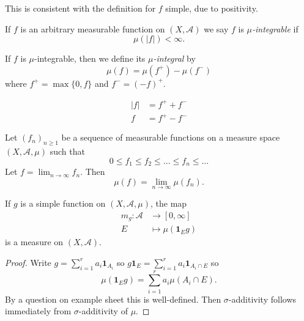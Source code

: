\documentclass[a4paper]{article}
\begin{document}
\begin{remark}
  This is consistent with the definition for \(f\) simple, due to positivity.
\end{remark}

\begin{definition}[integrable]
  If \(f\) is an arbitrary measurable function on \((X, \mathcal A)\) we say \(f\) is \emph{\(\mu\)-integrable} if
  \[
    \mu(|f|) < \infty.
  \]
\end{definition}

\begin{definition}
  If \(f\) is \(\mu\)-integrable, then we define its \emph{\(\mu\)-integral} by
  \[
    \mu(f) = \mu(f^+) - \mu(f^-)
  \]
  where \(f^+ = \max\{0, f\}\) and \(f^- = (-f)^+\).
\end{definition}

\begin{note}
  \begin{align*}
    |f| &= f^+ + f^- \\
    f &= f^+ - f^-
  \end{align*}
\end{note}

\begin{theorem}
  \label{thm:monotone convergence theorem}
  Let \((f_n)_{n \geq 1}\) be a sequence of measurable functions on a measure space \((X, \mathcal A, \mu)\) such that
  \[
    0 \leq f_1 \leq f_2 \leq \dots \leq f_n \leq \dots
  \]
  Let \(f = \lim_{n \to \infty} f_n\). Then
  \[
    \mu(f) = \lim_{n \to \infty} \mu(f_n).
  \]
\end{theorem}

\begin{lemma}
  If \(g\) is a simple function on \((X, \mathcal A, \mu)\), the map
  \begin{align*}
    m_g: \mathcal A &\to [0, \infty] \\
    E &\mapsto \mu(\mathbf 1_E g)
  \end{align*}
  is a measure on \((X, \mathcal A)\).
\end{lemma}

\begin{proof}
  Write \(g = \sum_{i = 1}^r a_i \mathbf 1_{A_i}\) so \(g \mathbf 1_E = \sum_{i = 1}^r a_i \mathbf 1_{A_i \cap E}\) so
  \[
    \mu(\mathbf 1_E g) = \sum_{i = 1}^r a_i \mu(A_i \cap E).
  \]
  By a question on example sheet this is well-defined. Then \(\sigma\)-additivity follows immediately from \(\sigma\)-additivity of \(\mu\).
\end{proof}
\end{document}
